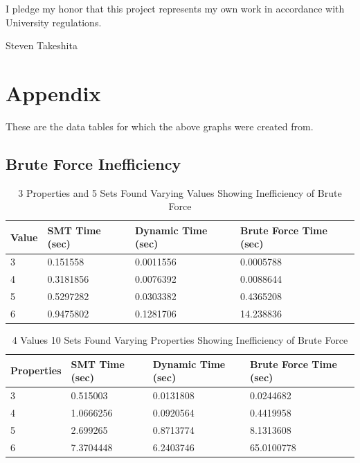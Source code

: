 \documentclass[pageno]{jpaper}
\begin{document}
I pledge my honor that this project represents my own work in accordance with University regulations.

Steven Takeshita


\section{Appendix}

These are the data tables for which the above graphs were created from. 

\subsection{Brute Force Inefficiency}

\begin{table}[htbp]
  \centering
  \begin{tabular}{|l   |l   |l |l | } \hline
    \textbf{Value} & \textbf{SMT Time (sec)}  & \textbf{Dynamic Time (sec)} & \textbf{Brute Force Time (sec)} \\\hline
    3          &   0.151558  &  0.0011556 & 0.0005788 \\ \hline 
    4          &   0.3181856 &  0.0076392 &  0.0088644 \\ \hline 
    5          &   0.5297282 &  0.0303382 &  0.4365208\\ \hline 
    6        &   0.9475802 &  0.1281706  & 14.238836 \\ \hline 
  \end{tabular}
  \caption{3 Properties and 5 Sets Found Varying Values Showing Inefficiency of Brute Force}
  \label{table:BruteValTable}
\end{table}

\begin{table}[htbp]
  \centering
  \begin{tabular}{|l   |l   |l  |l | } \hline
    \textbf{Properties} & \textbf{SMT Time (sec)}  & \textbf{Dynamic Time (sec)} & \textbf{Brute Force Time (sec)} \\\hline
    3          &   0.515003  &  0.0131808 & 0.0244682 \\ \hline 
    4          &   1.0666256 &  0.0920564 &  0.4419958 \\ \hline 
    5          &   2.699265 &  0.8713774 &  8.1313608\\ \hline 
    6        &   7.3704448 &  6.2403746  & 65.0100778 \\ \hline 
  \end{tabular}
  \caption{4 Values 10 Sets Found Varying Properties Showing Inefficiency of Brute Force}
  \label{table:BrutePropTable}
\end{table}
\end{document}
